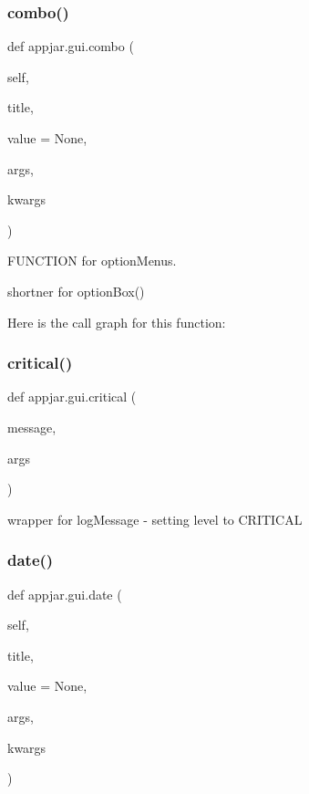 \subsubsection{\texorpdfstring{combo()}{combo()}}
{\footnotesize\ttfamily def appjar.\+gui.\+combo (\begin{DoxyParamCaption}\item[{}]{self,  }\item[{}]{title,  }\item[{}]{value = {\ttfamily None},  }\item[{}]{args,  }\item[{}]{kwargs }\end{DoxyParamCaption})}



F\+U\+N\+C\+T\+I\+ON for option\+Menus. 

\begin{DoxyVerb}shortner for optionBox() \end{DoxyVerb}
 Here is the call graph for this function\+:
\mbox{\label{classappjar_1_1gui_abfda3f17e34765b0202b6dc709eb1b28}} 
\subsubsection{\texorpdfstring{critical()}{critical()}}
{\footnotesize\ttfamily def appjar.\+gui.\+critical (\begin{DoxyParamCaption}\item[{}]{message,  }\item[{}]{args }\end{DoxyParamCaption})\hspace{0.3cm}{\ttfamily [static]}}

\begin{DoxyVerb}wrapper for logMessage - setting level to CRITICAL \end{DoxyVerb}
 \mbox{\label{classappjar_1_1gui_a490a20ea79169c697cdc7af5eb0a6199}} 
\subsubsection{\texorpdfstring{date()}{date()}}
{\footnotesize\ttfamily def appjar.\+gui.\+date (\begin{DoxyParamCaption}\item[{}]{self,  }\item[{}]{title,  }\item[{}]{value = {\ttfamily None},  }\item[{}]{args,  }\item[{}]{kwargs }\end{DoxyParamCaption})}



